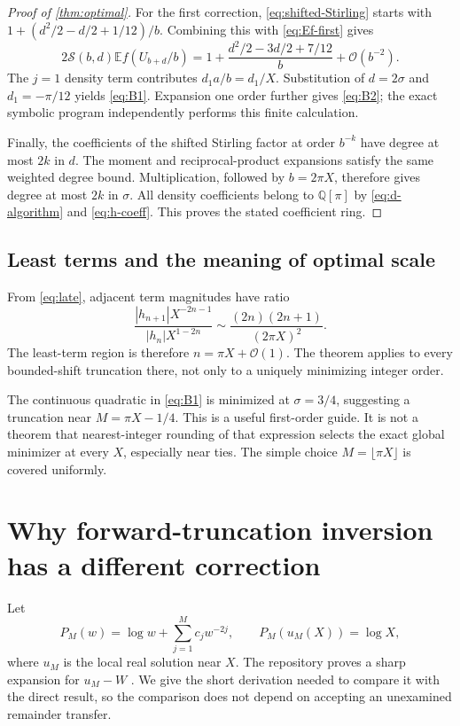 \documentclass[11pt,a4paper]{article}
\theoremstyle{definition}
\numberwithin{equation}{section}
\newcommand{\Oh}{\mathcal O}
\newcommand{\E}{\mathbb E}
\begin{document}
\begin{proof}[Proof of \cref{thm:optimal}]
For the first correction, \eqref{eq:shifted-Stirling} starts with
$1+(d^2/2-d/2+1/12)/b$. Combining this with \eqref{eq:Ef-first} gives
\[
 2\mathcal S(b,d)\E f(U_{b+d}/b)
 =1+\frac{d^2/2-3d/2+7/12}{b}+\Oh(b^{-2}).
\]
The $j=1$ density term contributes $d_1a/b=d_1/X$. Substitution of $d=2\sigma$ and $d_1=-\pi/12$ yields \eqref{eq:B1}. Expansion one order further gives \eqref{eq:B2}; the exact symbolic program independently performs this finite calculation.

Finally, the coefficients of the shifted Stirling factor at order $b^{-k}$ have degree at most $2k$ in $d$. The moment and reciprocal-product expansions satisfy the same weighted degree bound. Multiplication, followed by $b=2\pi X$, therefore gives degree at most $2k$ in $\sigma$. All density coefficients belong to $\mathbb Q[\pi]$ by \eqref{eq:d-algorithm} and \eqref{eq:h-coeff}. This proves the stated coefficient ring.
\end{proof}

\subsection{Least terms and the meaning of optimal scale}
From \eqref{eq:late}, adjacent term magnitudes have ratio
\[
 \frac{|h_{n+1}|X^{-2n-1}}{|h_n|X^{1-2n}}
 \sim\frac{(2n)(2n+1)}{(2\pi X)^2}.
\]
The least-term region is therefore $n=\pi X+\Oh(1)$. The theorem applies to every bounded-shift truncation there, not only to a uniquely minimizing integer order.

The continuous quadratic in \eqref{eq:B1} is minimized at $\sigma=3/4$, suggesting a truncation near $M=\pi X-1/4$. This is a useful first-order guide. It is not a theorem that nearest-integer rounding of that expression selects the exact global minimizer at every $X$, especially near ties. The simple choice $M=\lfloor\pi X\rfloor$ is covered uniformly.

\section{Why forward-truncation inversion has a different correction}
\label{sec:comparison}

Let
\begin{equation}
 P_M(w)=\log w+\sum_{j=1}^M c_jw^{-2j},\qquad
 P_M(u_M(X))=\log X,
 \label{eq:forward-truncation}
\end{equation}
where $u_M$ is the local real solution near $X$. The repository proves a sharp expansion for $u_M-W$ \cite{prior}. We give the short derivation needed to compare it with the direct result, so the comparison does not depend on accepting an unexamined remainder transfer.
\end{document}
